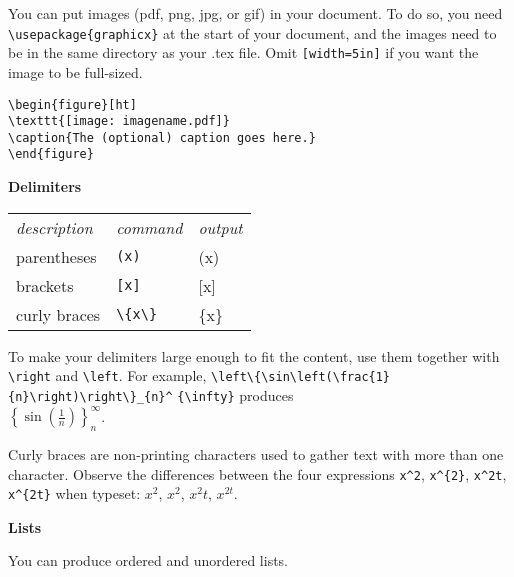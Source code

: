 \documentclass[10pt,landscape]{article}
\newcommand{\ColorSection}[1]{\par\vspace{1.5ex}\noindent\textcolor{sectioncolor}{\Large\bfseries #1}\par\vspace{0.75ex}}
\begin{document}
\begin{multicols}{3}
You can put images (pdf, png, jpg, or gif) in your document. To do so, you need \verb!\usepackage{graphicx}! at the start of your document, and the images need to be in the same directory as your .tex file. Omit   \verb![width=5in]! if you want the image to be full-sized.

\verb!\begin{figure}[ht]!\\
\verb!\texttt{[image: imagename.pdf]}!\\
\verb!\caption{The (optional) caption goes here.}!\\
\verb!\end{figure}!



\ColorSection{Delimiters}

\begin{tabular}{lll}
\emph{description} & \emph{command} & \emph{output}\\
parentheses &\verb!(x)! & (x)\\
brackets &\verb![x]! & [x]\\
curly braces& \verb!\{x\}! & \{x\}\\
\end{tabular}

To make your delimiters large enough to fit the content, use them together with \verb!\right! and \verb!\left!. For example, \verb!\left\{\sin\left(\frac{1}{n}\right)\right\}_{n}^! \verb!{\infty}! produces\\ $\displaystyle \left\{\sin\left(\frac{1}{n}\right)\right\}_{n}^{\infty}$.

Curly braces are non-printing characters used to gather text with more than one character. Observe the differences between the four expressions \verb!x^2!, \verb!x^{2}!, \verb!x^2t!, \verb!x^{2t}! when typeset: $x^2$, $x^{2}$, $x^2t$, $x^{2t}$.

\columnbreak
\ColorSection{Lists}

You can produce ordered and unordered lists.


\end{multicols}
\end{document}
